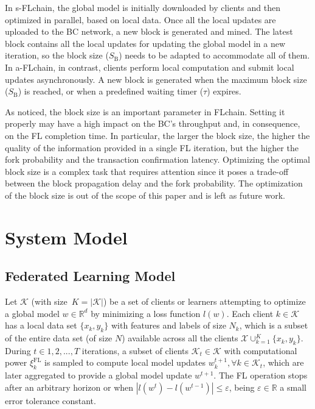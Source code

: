 \documentclass[10pt,journal,compsoc]{IEEEtran}
\begin{document}
In s-FLchain, the global model is initially downloaded by clients and then optimized in parallel, based on local data. Once all the local updates are uploaded to the BC network, a new block is generated and mined. The latest block contains all the local updates for updating the global model in a new iteration, so the block size ($S_\text{B}$) needs to be adapted to accommodate all of them. In a-FLchain, in contrast, clients perform local computation and submit local updates asynchronously. A new block is generated when the maximum block size ($S_\text{B}$) is reached, or when a predefined waiting timer ($\tau$) expires. %

As noticed, the block size is an important parameter in FLchain. Setting it properly may have a high impact on the BC's throughput and, in consequence, on the FL completion time. In particular, the larger the block size, the higher the quality of the information provided in a single FL iteration, but the higher the fork probability and the transaction confirmation latency. Optimizing the optimal block size is a complex task that requires attention since it poses a trade-off between the block propagation delay and the fork probability. The optimization of the block size is out of the scope of this paper and is left as future work.

\section{System Model}
\label{section:system_model}


\subsection{Federated Learning Model}
\label{section:fl_model}

Let $\mathcal{K}$ (with size~$K=|\mathcal{K}|$) be a set of clients or learners attempting to optimize a global model $w \in \mathbb{R}^d$ by minimizing a loss function $l(w)$. Each client $k\in \mathcal{K}$ has a local data set $\{x_k,y_k\}$ with features and labels of size $N_k$, which is a subset of the entire data set (of size $N$) available across all the clients $\mathcal{X}\cup_{k=1}^K \{x_k,y_k\}$. During $t\in 1,2,...,T$ iterations, a subset of clients $\mathcal{K}_t \in \mathcal{K}$ with computational power $\xi_k^\text{FL}$ is sampled to compute local model updates $w_k^{t+1}, \forall k\in \mathcal{K}_t$, which are later aggregated to provide a global model update $w^{t+1}$. The FL operation stops after an arbitrary horizon or when $|l(w^t) - l(w^{t-1})| \leq \varepsilon$, being $\varepsilon \in \mathbb{R}$ a small error tolerance constant.
\end{document}
